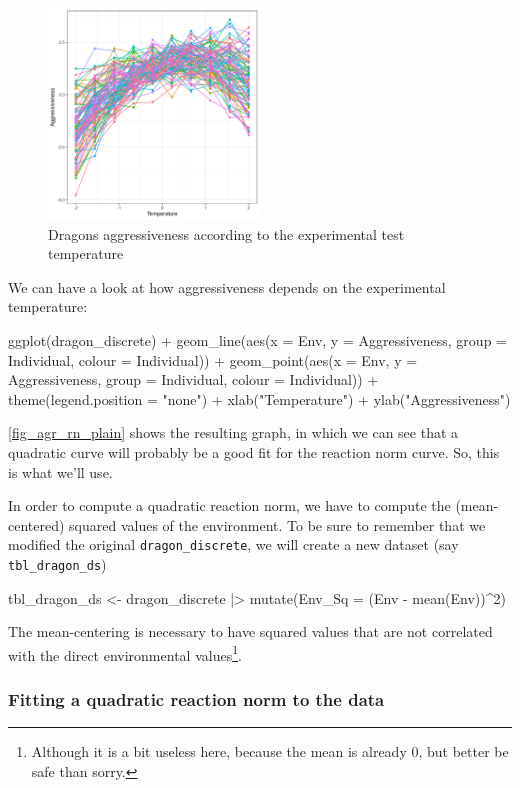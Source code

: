 \documentclass[a4paper,12pt,twoside]{article}
\begin{document}
\begin{figure}[b!h!t!]
  \includegraphics[width = 0.5\textwidth]{Aggressiveness_discrete.pdf}
  \caption{Dragons aggressiveness according to the experimental test temperature}
  \label{fig_agr_rn_plain}
\end{figure}

We can have a look at how aggressiveness depends on the experimental temperature:
\begin{Rinput}
ggplot(dragon_discrete) +
    geom_line(aes(x = Env, y = Aggressiveness, group = Individual, colour = Individual)) +
    geom_point(aes(x = Env, y = Aggressiveness, group = Individual, colour = Individual)) +
    theme(legend.position = "none") +
    xlab("Temperature") + ylab("Aggressiveness")
\end{Rinput}
\autoref{fig_agr_rn_plain} shows the resulting graph, in which we can see that a quadratic curve will probably be a good fit for the reaction norm curve. So, this is what we'll use.

In order to compute a quadratic reaction norm, we have to compute the (mean-centered) squared values of the environment. To be sure to remember that we modified the original \texttt{dragon\_discrete}, we will create a new dataset (say \texttt{tbl\_dragon\_ds})
\begin{Rinput}
tbl_dragon_ds <-
    dragon_discrete |>
    mutate(Env_Sq = (Env - mean(Env))^2)
\end{Rinput}
The mean-centering is necessary to have squared values that are not correlated with the direct environmental values\footnote{Although it is a bit useless here, because the mean is already 0, but better be safe than sorry.}.

\subsubsection{Fitting a quadratic reaction norm to the data}
\label{subsubsec_agr_ds_model}
\end{document}
